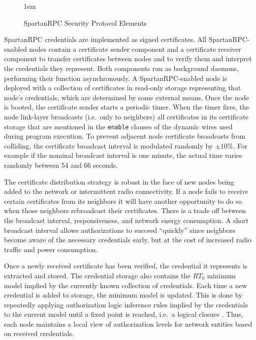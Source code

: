 \begin{figure}[t]
  
  \centerline{\raise 1em\box\graph}
  \vspace{2mm}
  \caption{SpartanRPC Security Protocol Elements}
  \label{figure-sprocketrt-protocol}
\end{figure}

\label{section-certificate-format}

SpartanRPC credentials are implemented as signed certificates. All
SpartanRPC-enabled nodes contain a certificate sender component and a
certificate receiver component to transfer certificates between nodes
and to verify them and interpret the credentials they represent. Both
components run as background daemons, performing their function
asynchronously. A SpartanRPC-enabled node is deployed with a collection
of certificates in read-only storage representing that node's
credentials, which are determined by some external means. Once the node
is booted, the certificate sender starts a periodic timer. When the
timer fires, the node link-layer broadcasts (i.e.~only to neighbors) all
certificates in its certificate storage that are mentioned in the
\texttt{enable} clauses of the dynamic wires used during program
execution. To prevent adjacent node certificate broadcasts from
colliding, the certificate broadcast interval is modulated randomly by
$\pm 10$\%. For example if the nominal broadcast interval is one minute,
the actual time varies randomly between 54 and 66 seconds.

The certificate distribution strategy is robust in the face of new nodes
being added to the network or intermittent radio connectivity. If a node
fails to receive certain certificates from its neighbors it will have
another opportunity to do so when those neighbors rebroadcast their
certificates. There is a trade off between the broadcast interval,
responsiveness, and network energy consumption. A short broadcast
interval allows authorizations to succeed ``quickly'' since neighbors
become aware of the necessary credentials early, but at the cost of
increased radio traffic and power consumption.

Once a newly received certificate has been verified, the credential it
represents is extracted and stored. The credential storage also contains
the $RT_0$ minimum model implied by the currently known collection of
credentials. Each time a new credential is added to storage, the minimum
model is updated. This is done by repeatedly applying authorization
logic inference rules implied by the credentials to the current model
until a fixed point is reached, i.e.~a logical closure \cite{Li:DCFTML}.
Thus, each node maintains a local view of authorization levels for
network entities based on received credentials.

